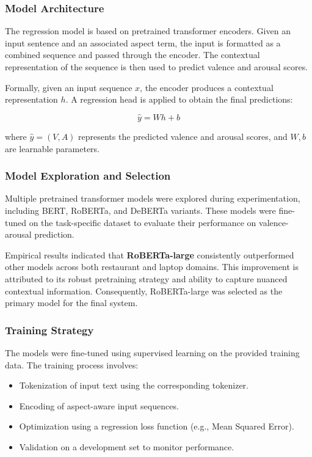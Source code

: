 \documentclass{article}
\begin{document}
\subsubsection{Model Architecture}

The regression model is based on pretrained transformer encoders. Given an input sentence and an associated aspect term, the input is formatted as a combined sequence and passed through the encoder. The contextual representation of the sequence is then used to predict valence and arousal scores.

Formally, given an input sequence $x$, the encoder produces a contextual representation $h$. A regression head is applied to obtain the final predictions:

\begin{equation}
\hat{y} = W h + b
\end{equation}

where $\hat{y} = (V, A)$ represents the predicted valence and arousal scores, and $W, b$ are learnable parameters.

\subsubsection{Model Exploration and Selection}

Multiple pretrained transformer models were explored during experimentation, including BERT, RoBERTa, and DeBERTa variants. These models were fine-tuned on the task-specific dataset to evaluate their performance on valence-arousal prediction.

Empirical results indicated that \textbf{RoBERTa-large} consistently outperformed other models across both restaurant and laptop domains. This improvement is attributed to its robust pretraining strategy and ability to capture nuanced contextual information. Consequently, RoBERTa-large was selected as the primary model for the final system.

\subsubsection{Training Strategy}

The models were fine-tuned using supervised learning on the provided training data. The training process involves:

\begin{itemize}
    \item Tokenization of input text using the corresponding tokenizer.
    \item Encoding of aspect-aware input sequences.
    \item Optimization using a regression loss function (e.g., Mean Squared Error).
    \item Validation on a development set to monitor performance.
\end{itemize}
\end{document}
